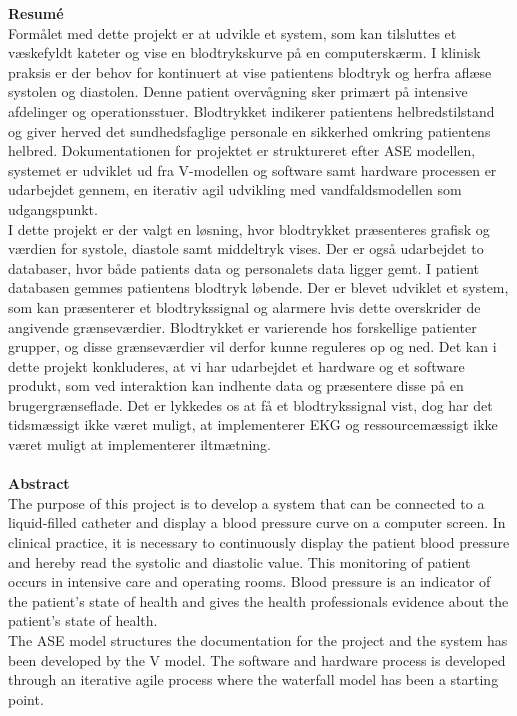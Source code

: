 \textbf{Resumé}\\
Formålet med dette projekt er at udvikle et system, som kan tilsluttes et væskefyldt kateter og vise en blodtrykskurve på en computerskærm. I klinisk praksis er der behov for kontinuert at vise patientens blodtryk og herfra aflæse systolen og diastolen. Denne patient overvågning sker primært på intensive afdelinger og operationsstuer. Blodtrykket indikerer patientens helbredstilstand og giver herved det sundhedsfaglige personale en sikkerhed omkring patientens helbred. Dokumentationen for projektet er struktureret efter ASE modellen, systemet er udviklet ud fra V-modellen og software samt hardware processen er udarbejdet gennem, en iterativ agil udvikling med vandfaldsmodellen som udgangspunkt. \\
I dette projekt er der valgt en løsning, hvor blodtrykket præsenteres grafisk og værdien for systole, diastole samt middeltryk vises. Der er også udarbejdet to databaser, hvor både patients data og personalets data ligger gemt. I patient databasen gemmes patientens blodtryk løbende. Der er blevet udviklet et system, som kan præsenterer et blodtrykssignal og alarmere hvis dette overskrider de angivende grænseværdier. Blodtrykket er varierende hos forskellige patienter grupper, og disse grænseværdier vil derfor kunne reguleres op og ned. Det kan i dette projekt konkluderes, at vi har udarbejdet et hardware og et software produkt, som ved interaktion kan indhente data og præsentere disse på en brugergrænseflade. Det er lykkedes os at få et blodtrykssignal vist, dog har det tidsmæssigt ikke været muligt, at implementerer EKG og ressourcemæssigt ikke været muligt at implementerer iltmætning. \\\\
\textbf{Abstract}\\
The purpose of this project is to develop a system that can be connected to a liquid-filled catheter and display a blood pressure curve on a computer screen. In clinical practice, it is necessary to continuously display the patient blood pressure and hereby read the systolic and diastolic value. This monitoring of patient occurs in intensive care and operating rooms. Blood pressure is an indicator of the patient’s state of health and gives the health professionals evidence about the patient’s state of health. \\
The ASE model structures the documentation for the project and the system has been developed by the V model. The software and hardware process is developed through an iterative agile process where the waterfall model has been a starting point.\\
